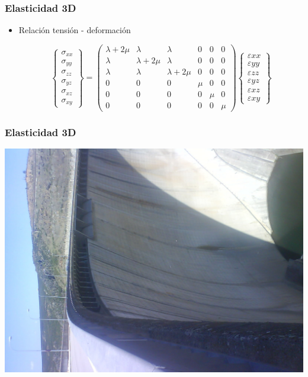 \documentclass[handout]{beamer}
\begin{document}
\begin{frame}
\frametitle{Elasticidad 3D}
\begin{itemize}
\item Relación tensión -  deformación
\begin{small}
\begin{equation}
\left\{
\begin{array}{c}
\sigma_{xx} \\
\sigma_{yy} \\
\sigma_{zz} \\
\sigma_{yz} \\
\sigma_{xz} \\
\sigma_{xy}
\end{array}
\right\}=
\left(
\begin{array}{cccccc}
\lambda + 2 \mu & \lambda       & \lambda       & 0     & 0     & 0     \\
\lambda         & \lambda+2 \mu & \lambda       & 0     & 0     & 0     \\
\lambda         & \lambda       & \lambda+2 \mu & 0     & 0     & 0     \\
0               & 0             & 0             & \mu   & 0     & 0     \\
0               & 0             & 0             & 0     & \mu   & 0     \\
0               & 0             & 0             & 0     & 0     & \mu   
\end{array}
\right)
\left\{
\begin{array}{c}
\varepsilon{xx} \\
\varepsilon{yy} \\
\varepsilon{zz} \\
\varepsilon{yz} \\
\varepsilon{xz} \\
\varepsilon{xy}
\end{array}
\right\}
\end{equation}
\end{small}
\end{itemize}
\end{frame}
\begin{frame}
\frametitle{Elasticidad 3D}
\begin{center}
\includegraphics[width=0.85\textheight,angle=-90]{el_atazar_02}
\end{center}
\end{frame}
\end{document}
